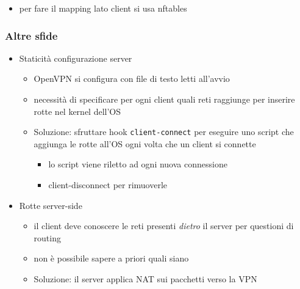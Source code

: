 \begin{frame}
\begin{enumerate}
    \end{enumerate}

    \begin{itemize}
        \item per fare il mapping lato client si usa \alert{nftables}
    \end{itemize}
\end{frame}

\begin{frame}
    \frametitle{Altre sfide}
    \begin{itemize}
        \item \alert{Staticità configurazione server}
        \begin{itemize}
            \item OpenVPN si configura con file di testo letti all'avvio
            \item necessità di specificare per ogni client quali reti raggiunge per inserire
            rotte nel kernel dell'OS
            \item \alert{Soluzione}: sfruttare hook \alert{\texttt{client-connect}} per eseguire
            uno script che aggiunga le rotte all'OS ogni volta che un client si connette
            \begin{itemize}
                \item lo script viene riletto ad ogni nuova connessione
                \item \alert{client-disconnect} per rimuoverle
            \end{itemize}
        \end{itemize}

        \item \alert{Rotte server-side}
        \begin{itemize}
            \item il client deve conoscere le reti presenti \textit{dietro} il server per questioni di
            routing
            \item non è possibile sapere a priori quali siano
            \item \alert{Soluzione}: il server applica NAT sui pacchetti verso la VPN
        \end{itemize}
    \end{itemize}
\end{frame}

